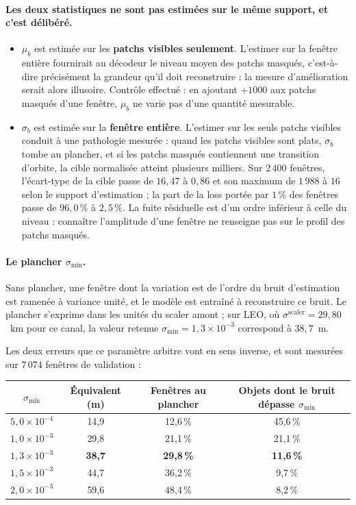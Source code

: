 \documentclass{article}
\begin{document}
\paragraph{Les deux statistiques ne sont pas estimées sur le même support, et c'est délibéré.}
\begin{itemize}
    \item $\mu_b$ est estimée sur les \textbf{patchs visibles seulement}. L'estimer sur la fenêtre entière fournirait au décodeur le niveau moyen des patchs masqués, c'est-à-dire précisément la grandeur qu'il doit reconstruire : la mesure d'amélioration serait alors illusoire. Contrôle effectué : en ajoutant $+1000$ aux patchs masqués d'une fenêtre, $\mu_b$ ne varie pas d'une quantité mesurable.
    \item $\sigma_b$ est estimée sur la \textbf{fenêtre entière}. L'estimer sur les seuls patchs visibles conduit à une pathologie mesurée : quand les patchs visibles sont plats, $\sigma_b$ tombe au plancher, et si les patchs masqués contiennent une transition d'orbite, la cible normalisée atteint plusieurs milliers. Sur 2\,400 fenêtres, l'écart-type de la cible passe de $16{,}47$ à $0{,}86$ et son maximum de $1\,988$ à $16$ selon le support d'estimation ; la part de la loss portée par $1\,\%$ des fenêtres passe de $96{,}0\,\%$ à $2{,}5\,\%$. La fuite résiduelle est d'un ordre inférieur à celle du niveau : connaître l'amplitude d'une fenêtre ne renseigne pas sur le profil des patchs masqués.
\end{itemize}

\paragraph{Le plancher $\sigma_{\min}$.} Sans plancher, une fenêtre dont la variation est de l'ordre du bruit d'estimation est ramenée à variance unité, et le modèle est entraîné à reconstruire ce bruit. Le plancher s'exprime dans les unités du scaler amont ; sur LEO, où $\sigma^{\text{scaler}} = 29{,}80$~km pour ce canal, la valeur retenue $\sigma_{\min} = 1{,}3\times10^{-3}$ correspond à $38{,}7$~m.

Les deux erreurs que ce paramètre arbitre vont en sens inverse, et sont mesurées sur $7\,074$ fenêtres de validation :

\begin{center}
\begin{tabular}{cccc}
\toprule
$\sigma_{\min}$ & Équivalent (m) & Fenêtres au plancher & Objets dont le bruit dépasse $\sigma_{\min}$ \\
\midrule
$5{,}0\times10^{-4}$ & 14,9 & 12,6\,\% & 45,6\,\% \\
$1{,}0\times10^{-3}$ & 29,8 & 21,1\,\% & 21,1\,\% \\
\textbf{$1{,}3\times10^{-3}$} & \textbf{38,7} & \textbf{29,8\,\%} & \textbf{11,6\,\%} \\
$1{,}5\times10^{-3}$ & 44,7 & 36,2\,\% & 9,7\,\% \\
$2{,}0\times10^{-3}$ & 59,6 & 48,4\,\% & 8,2\,\% \\
\bottomrule
\end{tabular}
\end{center}
\end{document}
